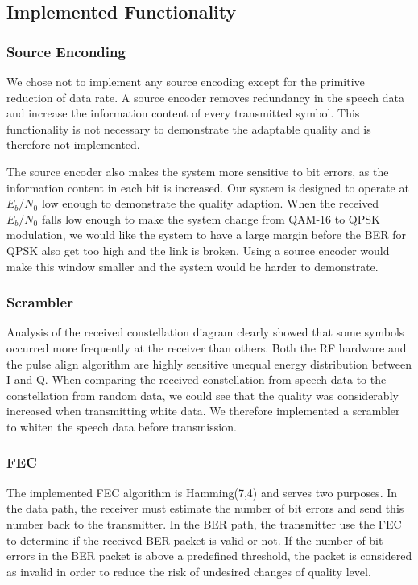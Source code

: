 \subsection{Implemented Functionality}
\subsubsection{Source Enconding}
We chose not to implement any source encoding except for the primitive reduction of data rate. A source encoder removes redundancy in the speech data and increase the information content of every transmitted symbol. This functionality is not necessary to demonstrate the adaptable quality and is therefore not implemented. 

The source encoder also makes the system more sensitive to bit errors, as the information content in each bit is increased. Our system is designed to operate at $E_b / N_0$ low enough to demonstrate the quality adaption. When the received $E_b / N_0$ falls low enough to make the system change from QAM-16 to QPSK modulation, we would like the system to have a large margin before the BER for QPSK also get too high and the link is broken. Using a source encoder would make this window smaller and the system would be harder to demonstrate. 

\subsubsection{Scrambler}
Analysis of the received constellation diagram clearly showed that some symbols occurred more frequently at the receiver than others. Both the RF hardware and the pulse align algorithm are highly sensitive unequal energy distribution between I and Q. When comparing the received constellation from speech data to the constellation from random data, we could see that the quality was considerably increased when transmitting white data. We therefore implemented a scrambler to whiten the speech data before transmission. 

\subsubsection{FEC}
The implemented FEC algorithm is Hamming(7,4) and serves two purposes. In the data path, the receiver must estimate the number of bit errors and send this number back to the transmitter. In the BER path, the transmitter use the FEC to determine if the received BER packet is valid or not. If the number of bit errors in the BER packet is above a predefined threshold, the packet is considered as invalid in order to reduce the risk of undesired changes of quality level. 


